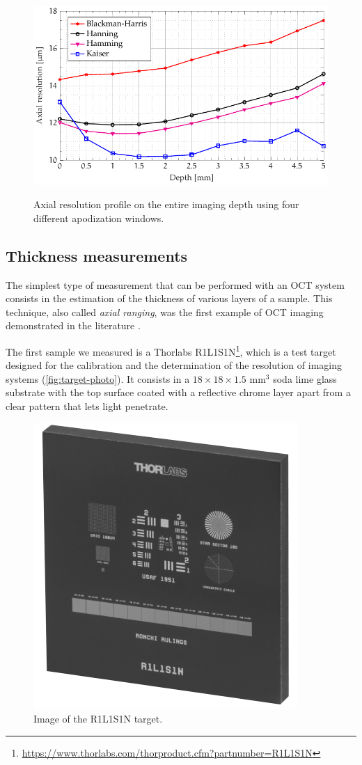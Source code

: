 \begin{figure}[hbt]
	\myfloatalign
	{\includegraphics[width=0.8\linewidth]{gfx/ch3/risoluzione-profondita}}
	\caption{Axial resolution profile on the entire imaging depth using four different apodization windows.}\label{fig:axial-resolution-depth}
\end{figure}


\subsection{Thickness measurements}
The simplest type of measurement that can be performed with an OCT system consists in the estimation of the thickness of various layers of a sample. This technique, also called \emph{axial ranging}, was the first example of OCT imaging demonstrated in the literature \cite{Fujimoto1986}. 

The first sample we measured is a Thorlabs R1L1S1N\footnote{\url{https://www.thorlabs.com/thorproduct.cfm?partnumber=R1L1S1N}}, which is a test target designed for the calibration and the determination of the resolution of imaging systems (\autoref{fig:target-photo}). It consists in a $18\times18\times1.5$ mm$^3$ soda lime glass substrate with the top surface coated with a reflective chrome layer apart from a clear pattern that lets light penetrate. 


\begin{figure}
	\myfloatalign
	\includegraphics[width=0.3\linewidth]{gfx/ch3/target}
	\caption{Image of the R1L1S1N target.}\label{fig:target-photo}
\end{figure}


